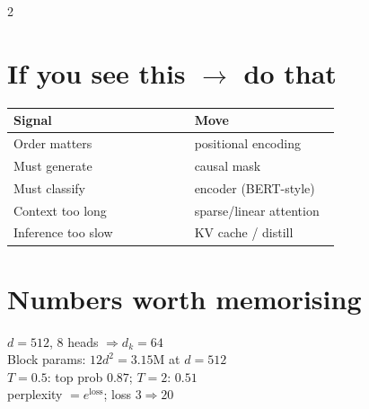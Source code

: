\documentclass[11pt,a4paper]{article}
\newcommand{\sect}[1]{\section*{#1}}
\begin{document}
\begin{multicols}{2}
\sect{If you see this $\rightarrow$ do that}
\begin{tabular}{@{}p{0.52\linewidth}p{0.42\linewidth}@{}}
\toprule
Signal & Move\\
\midrule
Order matters & positional encoding\\
Must generate & causal mask\\
Must classify & encoder (BERT-style)\\
Context too long & sparse/linear attention\\
Inference too slow & KV cache / distill\\
\bottomrule
\end{tabular}


\sect{Numbers worth memorising}
$d{=}512$, 8 heads $\Rightarrow d_k=64$\\
Block params: $12d^2=3.15$M at $d{=}512$\\
$T{=}0.5$: top prob $0.87$; $T{=}2$: $0.51$\\
perplexity $=e^{\text{loss}}$; loss $3\Rightarrow20$

\end{multicols}
\end{document}
